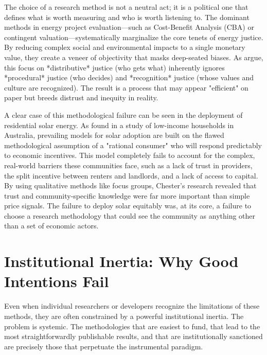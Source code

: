 \documentclass[11pt, letterpaper, twocolumn]{article}
\begin{document}
The choice of a research method is not a neutral act; it is a political one that defines what is worth measuring and who is worth listening to. The dominant methods in energy project evaluation---such as Cost-Benefit Analysis (CBA) or contingent valuation---systematically marginalize the core tenets of energy justice. By reducing complex social and environmental impacts to a single monetary value, they create a veneer of objectivity that masks deep-seated biases. As \citet{sovacool_dworkin_2015} argue, this focus on *distributive* justice (who gets what) inherently ignores *procedural* justice (who decides) and *recognition* justice (whose values and culture are recognized). The result is a process that may appear "efficient" on paper but breeds distrust and inequity in reality.

A clear case of this methodological failure can be seen in the deployment of residential solar energy. As \citet{chester_2018} found in a study of low-income households in Australia, prevailing models for solar adoption are built on the flawed methodological assumption of a "rational consumer" who will respond predictably to economic incentives. This model completely fails to account for the complex, real-world barriers these communities face, such as a lack of trust in providers, the split incentive between renters and landlords, and a lack of access to capital. By using qualitative methods like focus groups, Chester's research revealed that trust and community-specific knowledge were far more important than simple price signals. The failure to deploy solar equitably was, at its core, a failure to choose a research methodology that could see the community as anything other than a set of economic actors.

\section{Institutional Inertia: Why Good Intentions Fail}

Even when individual researchers or developers recognize the limitations of these methods, they are often constrained by a powerful institutional inertia. The problem is systemic. The methodologies that are easiest to fund, that lead to the most straightforwardly publishable results, and that are institutionally sanctioned are precisely those that perpetuate the instrumental paradigm.
\end{document}
